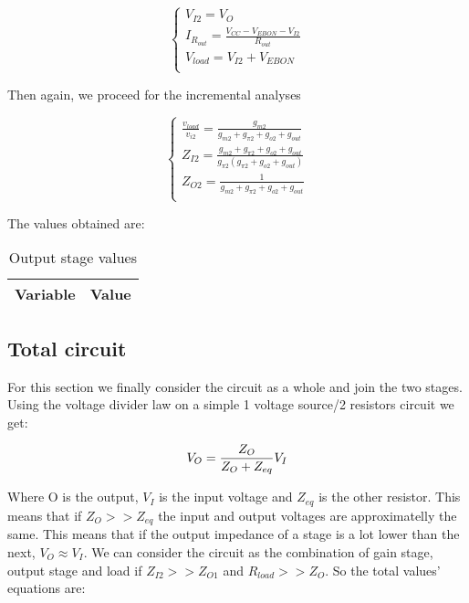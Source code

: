 \begin{equation}\label{eq:Op2}
\begin{cases}
V_{I2}=V_O\\
I_{R_{out}}= \frac{V_{CC}-V_{EBON}-V_{I2}}{R_{out}}\\
V_{load}=V_{I2}+ V_{EBON}\\
\end{cases}
\end{equation}

Then again, we proceed for the incremental analyses

\begin{equation}\label{eq:v2}
\begin{cases}
\frac{v_{load}}{v_{i2}}=\frac{g_{m2}}{g_{m2}+g_{\pi 2}+g_{o2}+g_{out}}\\
Z_{I2}= \frac{g_{m2}+g_{\pi 2}+ g_{o2}+g_{out}}{g_{\pi 2} (g_{\pi 2}+ g_{o2}+g_{out})}\\
Z_{O2}= \frac{1}{g_{m2}+g_{\pi 2}+ g_{o2}+g_{out}}\\
\end{cases}
\end{equation}

The values obtained are:

\begin{table}[H]
  \centering
  \begin{tabular}{|l|r|}
    \hline    
    {\bf Variable} & {\bf Value} \\ \hline
    
  \end{tabular}
  \caption{Output stage values}
  \label{tab:sim1}
\end{table}


\subsection{Total circuit}
For this section we finally consider the circuit as a whole and join the two stages. Using the voltage divider law on a simple 1 voltage source/2 resistors circuit we get:

\begin{equation}\label{eq:approx}
V_O=\frac{Z_O}{Z_O+Z_{eq}}V_I\\
\end{equation}

 Where O is the output, $V_I$ is the input voltage and $Z_{eq}$ is the other resistor. This means that if $Z_O >> Z_{eq}$ the input and output voltages are approximatelly the same. This means that if the output impedance of a stage is a lot lower than the next, $V_O\approx V_I$. We can consider the circuit as the combination of gain stage, output stage and load if $Z_{I2} >> Z_{O1}$ and $R_{load} >> Z_{O}$. So the total values' equations are:
 
